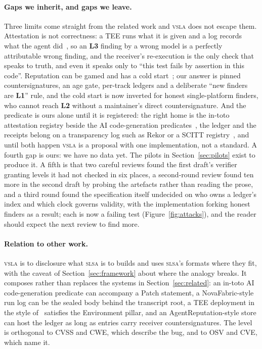 \documentclass[11pt]{article}
\newcommand{\vsla}{\textsc{vsla}}
\newcommand{\slsa}{\textsc{slsa}}
\newcommand{\lvl}[1]{\textbf{L#1}}
\begin{document}
\paragraph{Gaps we inherit, and gaps we leave.}
Three limits come straight from the related work and \vsla{} does not escape them. Attestation is not
correctness: a TEE runs what it is given and a log records what the agent did~\cite{aiidentity,cryptoai,agentoutput},
so an \lvl{3} finding by a wrong model is a perfectly attributable wrong finding, and the receiver's re-execution
is the only check that speaks to truth, and even it speaks only to ``this test fails by assertion in this
code''. Reputation can be gamed and has a cold start~\cite{agentreputation}; our answer is pinned
countersignatures, an age gate, per-track ledgers and a deliberate ``new finders are \lvl{1}'' rule, and the
cold start is now inverted for honest single-platform finders, who cannot reach \lvl{2} without a maintainer's
direct countersignature. And the predicate is ours alone until it is registered: the right home is the
in-toto attestation registry beside the AI code-generation predicates~\cite{intoto604}, the ledger and the
receipts belong on a transparency log such as Rekor or a SCITT registry~\cite{sigstore,scitt}, and until both
happen \vsla{} is a proposal with one implementation, not a standard. A fourth gap is ours: we have no data
yet. The pilots in Section~\ref{sec:pilots} exist to produce it. A fifth is that two careful reviews found the
first draft's verifier granting levels it had not checked in six places, a second-round review found ten more in
the second draft by probing the artefacts rather than reading the prose, and a third round found the specification
itself undecided on who owns a ledger's index and which clock governs validity, with the implementation forking
honest finders as a result; each is now a failing test (Figure~\ref{fig:attacks}), and the reader should expect the
next review to find more.

\paragraph{Relation to other work.}
\vsla{} is to disclosure what \slsa{} is to builds and uses \slsa{}'s formats where they fit, with the caveat
of Section~\ref{sec:framework} about where the analogy breaks. It composes rather than replaces the systems in
Section~\ref{sec:related}: an in-toto AI code-generation predicate can accompany a Patch statement, a
NovaFabric-style run log can be the sealed body behind the transcript root, a TEE deployment in the style
of~\cite{teegrant} satisfies the Environment pillar, and an AgentReputation-style store can host the ledger as
long as entries carry receiver countersignatures. The level is orthogonal to CVSS and CWE, which describe the
bug, and to OSV and CVE, which name it.
\end{document}

